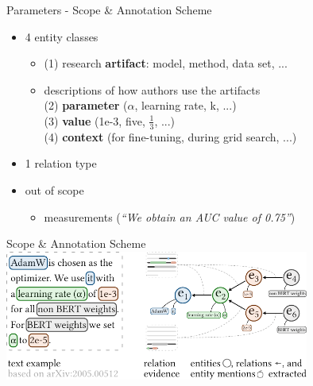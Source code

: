 \documentclass[en,16:9,smallfoot]{sdqbeamer}
\begin{document}
   \begin{frame}{Parameters - Scope \& Annotation Scheme}
   \begin{itemize}
       \item 4 entity classes
       \begin{itemize}
           \item (1) research \textbf{artifact}: model, method, data set, ...
           \item descriptions of how authors use the artifacts\\
                (2) \textbf{parameter} ($\alpha$, learning rate, k, ...)\\
                (3) \textbf{value} (1e-3, five, $\frac{1}{3}$, ...)\\
                (4) \textbf{context} (for fine-tuning, during grid search, ...)
       \end{itemize}
       \item 1 relation type
       \item out of scope
           \begin{itemize}
                \item measurements (\textit{``We obtain an AUC value of 0.75''})
           \end{itemize}
   \end{itemize}
   \end{frame}

   \begin{frame}{Scope \& Annotation Scheme}
       \centering
       \includegraphics[width=0.75\textwidth]{imgs/schema_visual_v3}
   \end{frame}
\end{document}

